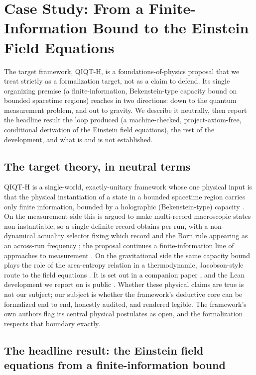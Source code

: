 \documentclass[11pt]{article}
\begin{document}
\section{Case Study: From a Finite-Information Bound to the Einstein Field Equations}

The target framework, QIQT-H, is a foundations-of-physics proposal that we treat strictly as a
formalization target, not as a claim to defend. Its single organizing premise (a finite-information,
Bekenstein-type capacity bound on bounded spacetime regions) reaches in two directions: down to the
quantum measurement problem, and out to gravity. We describe it neutrally, then report the headline
result the loop produced (a machine-checked, project-axiom-free, conditional derivation of the
Einstein field equations),
the rest of the development, and what is and is not established.

\subsection{The target theory, in neutral terms}

QIQT-H is a single-world, exactly-unitary framework whose one physical input is that the physical
instantiation of a state in a bounded spacetime region carries only finite information, bounded by a
holographic (Bekenstein-type) capacity \cite{r40}. On the measurement side this is argued to make
multi-record macroscopic states non-instantiable, so a single definite record obtains per run, with
a non-dynamical actuality selector fixing which record and the Born rule appearing as an across-run
frequency \cite{r32,r33,r34}; the proposal continues a finite-information line of approaches to
measurement \cite{r41}. On the gravitational side the same capacity bound plays the role of the
area-entropy relation in a thermodynamic, Jacobson-style route to the field equations \cite{r46}. It
is set out in a companion paper \cite{r42}, and the Lean development we report on is public
\cite{r43}. Whether these physical claims are true is not our subject; our subject is whether the
framework's deductive core can be formalized end to end, honestly audited, and rendered legible. The
framework's own authors flag its central physical postulates as open, and the formalization respects
that boundary exactly.

\subsection{The headline result: the Einstein field equations from a finite-information bound}
\end{document}
